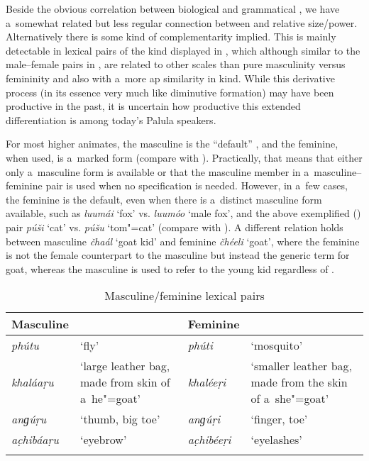 Beside the obvious correlation between biological and grammatical , we have a~somewhat related but less regular connection between  and relative size/power. Alternatively there is some kind of complementarity implied. This is mainly detectable in lexical pairs of the kind displayed in , which although similar to the male--female pairs in , are related to other scales than pure masculinity versus femininity and also with a~more ap similarity in kind. While this derivative process (in its essence very much like diminutive formation) may have been productive in the past, it is uncertain how productive this extended  differentiation is among today's Palula speakers.

For most higher animates, the masculine  is the ``default'' , and the feminine, when used, is a~marked form (compare with ). Practically, that means that either only a~masculine form is available or that the masculine member in a~masculine--feminine pair is used when no specification is needed. However, in a~few cases, the feminine is the default, even when there is a~distinct masculine form available, such as \textit{luumái} `fox' vs. \textit{luumóo} `male fox', and the above exemplified () pair \textit{púši} `cat' vs. \textit{púšu} `tom"=cat' (compare with \citealt[103--104]{dahl2000}). A different relation holds between masculine \textit{čhaál} `goat kid' and feminine \textit{čhéeli} `goat', where the feminine  is not the female counterpart to the masculine but instead the generic term for goat, whereas the masculine is used to refer to the young kid regardless of .


\begin{table}[t]
\caption{Masculine/feminine lexical pairs}
\begin{tabularx}{\textwidth}{ l Q l Q }
\lsptoprule
Masculine &
&
Feminine &
\\\midrule
\textit{phútu} &
`fly' &
\textit{phúti} &
`mosquito'\\
\textit{khaláaṛu}
&
`large leather bag, made from skin of a~he"=goat' &
\textit{khaléeṛi}
&
`smaller leather bag, made from the skin of a~she"=goat'\\
\textit{anɡúṛu} &
`thumb, big toe' &
\textit{anɡúṛi} &
`finger, toe'\\
\textit{ac̣hibáaṛu} &
`eyebrow' &
\textit{ac̣hibéeṛi} &
`eyelashes'\\\lspbottomrule
\end{tabularx}
\label{tab:4-2}
\end{table}

